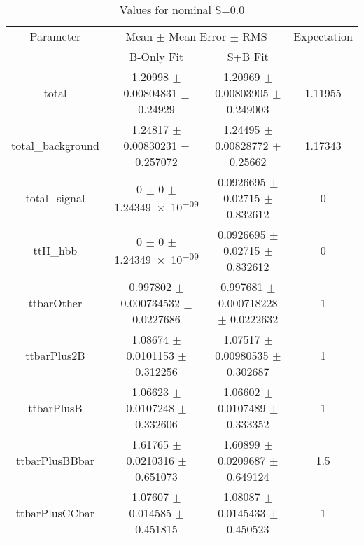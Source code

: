 \begin{table}
\centering
\caption{Values for nominal S=0.0}
\begin{tabular}{cccc}
\toprule
Parameter & \multicolumn{2}{c}{Mean $\pm$ Mean Error $\pm$ RMS} & Expectation\\
 & B-Only Fit & S+B Fit & \\
\midrule
total & \num{1.20998} $\pm$ \num{0.00804831} $\pm$ \num{0.24929} & \num{1.20969} $\pm$ \num{0.00803905} $\pm$ \num{0.249003} & \num{1.11955}\\
total\_background & \num{1.24817} $\pm$ \num{0.00830231} $\pm$ \num{0.257072} & \num{1.24495} $\pm$ \num{0.00828772} $\pm$ \num{0.25662} & \num{1.17343}\\
total\_signal & \num{0} $\pm$ \num{0} $\pm$ \num{1.24349e-09} & \num{0.0926695} $\pm$ \num{0.02715} $\pm$ \num{0.832612} & \num{0}\\
ttH\_hbb & \num{0} $\pm$ \num{0} $\pm$ \num{1.24349e-09} & \num{0.0926695} $\pm$ \num{0.02715} $\pm$ \num{0.832612} & \num{0}\\
ttbarOther & \num{0.997802} $\pm$ \num{0.000734532} $\pm$ \num{0.0227686} & \num{0.997681} $\pm$ \num{0.000718228} $\pm$ \num{0.0222632} & \num{1}\\
ttbarPlus2B & \num{1.08674} $\pm$ \num{0.0101153} $\pm$ \num{0.312256} & \num{1.07517} $\pm$ \num{0.00980535} $\pm$ \num{0.302687} & \num{1}\\
ttbarPlusB & \num{1.06623} $\pm$ \num{0.0107248} $\pm$ \num{0.332606} & \num{1.06602} $\pm$ \num{0.0107489} $\pm$ \num{0.333352} & \num{1}\\
ttbarPlusBBbar & \num{1.61765} $\pm$ \num{0.0210316} $\pm$ \num{0.651073} & \num{1.60899} $\pm$ \num{0.0209687} $\pm$ \num{0.649124} & \num{1.5}\\
ttbarPlusCCbar & \num{1.07607} $\pm$ \num{0.014585} $\pm$ \num{0.451815} & \num{1.08087} $\pm$ \num{0.0145433} $\pm$ \num{0.450523} & \num{1}\\
\bottomrule
\end{tabular}
\end{table}